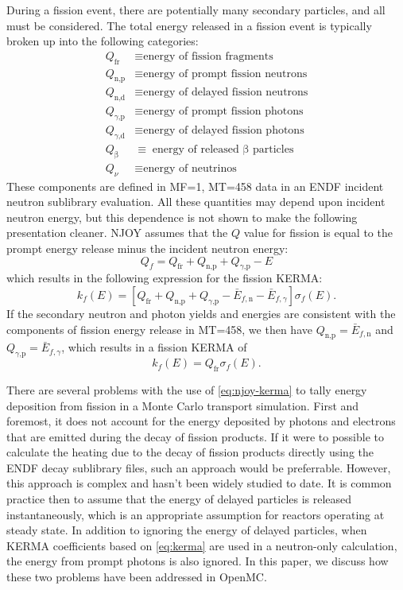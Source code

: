 \documentclass{anstrans}
\newcommand{\efr}{Q_\text{fr}}
\newcommand{\enp}{Q_\text{n,p}}
\newcommand{\ened}{Q_\text{n,d}}
\newcommand{\egp}{Q_\text{$\gamma$,p}}
\newcommand{\egd}{Q_\text{$\gamma$,d}}
\newcommand{\eb}{Q_\upbeta}
\newcommand{\enu}{Q_\nu}
\begin{document}
During a fission event, there are potentially many secondary particles, and all
must be considered. The total energy released in a fission event is typically
broken up into the following categories:
\begin{equation*}
\begin{split}
  \efr  &\equiv \text{energy of fission fragments} \\
  \enp  &\equiv \text{energy of prompt fission neutrons} \\
  \ened &\equiv \text{energy of delayed fission neutrons} \\
  \egp  &\equiv \text{energy of prompt fission photons} \\
  \egd  &\equiv \text{energy of delayed fission photons} \\
  \eb   &\equiv \text{energy of released $\upbeta$ particles} \\
  \enu  &\equiv \text{energy of neutrinos}
\end{split}
\end{equation*}
These components are defined in MF=1, MT=458 data in an ENDF incident neutron
sublibrary evaluation. All these quantities may depend upon incident neutron
energy, but this dependence is not shown to make the following presentation
cleaner. NJOY assumes that the $Q$ value for fission is equal to the prompt
energy release minus the incident neutron energy:
\begin{equation}
    \label{eq:njoy-fissq}
    Q_f = \efr + \enp + \egp - E
\end{equation}
which results in the following expression for the fission KERMA:
\begin{equation}
    k_f(E) = \left[\efr + \enp + \egp - \bar{E}_{f,\text{n}} - \bar{E}_{f,\gamma}\right]\sigma_f(E).
\end{equation}
If the secondary neutron and photon yields and energies are consistent with the
components of fission energy release in MT=458, we then have $\enp =
\bar{E}_{f,\text{n}}$ and $\egp = \bar{E}_{f,\gamma}$, which results in a
fission KERMA of
\begin{equation}
    \label{eq:njoy-kerma}
    k_f(E) = \efr \sigma_f(E).
\end{equation}

There are several problems with the use of \cref{eq:njoy-kerma} to tally energy
deposition from fission in a Monte Carlo transport simulation. First and
foremost, it does not account for the energy deposited by photons and electrons
that are emitted during the decay of fission products. If it were to possible to
calculate the heating due to the decay of fission products directly using the
ENDF decay sublibrary files, such an approach would be preferrable. However,
this approach is complex and hasn't been widely studied to date. It is common
practice then to assume that the energy of delayed particles is released
instantaneously, which is an appropriate assumption for reactors operating at
steady state. In addition to ignoring the energy of delayed particles, when
KERMA coefficients based on \cref{eq:kerma} are used in a neutron-only
calculation, the energy from prompt photons is also ignored. In this paper, we
discuss how these two problems have been addressed in OpenMC.
\end{document}
